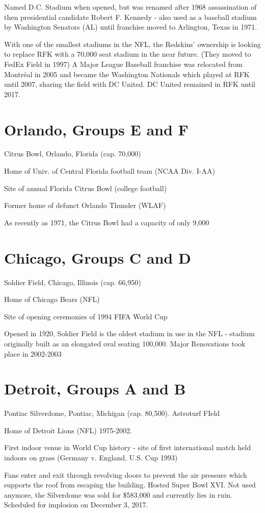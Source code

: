 Named D.C. Stadium when opened, but was renamed after 1968 assassination of 
then presidential candidate Robert F. Kennedy - also used as a baseball stadium
by Washington Senators (AL) until franchise moved to Arlington, Texas in 1971.

With one of the smallest stadiums in the NFL, the Redskins' ownership is 
looking to replace RFK with a 70,000 seat stadium in the near future.  (They moved
to FedEx Field in 1997)  A Major League Baseball franchise was relocated from
Montr{\'e}al in 2005 and became the Washington Nationals which played at RFK until 2007,
sharing the field with DC United.  DC United remained in RFK until 2017.
\section{Orlando, Groups E and F}
Citrus Bowl, Orlando, Florida (cap. 70,000)

Home of Univ. of Central Florida football team (NCAA Div. I-AA)

Site of annual Florida Citrus Bowl (college football)

Former home of defunct Orlando Thunder (WLAF)

As recently as 1971, the Citrus Bowl had a capacity of only 9,000
\section{Chicago, Groups C and D}
Soldier Field, Chicago, Illinois (cap. 66,950)

Home of Chicago Bears (NFL)

Site of opening ceremonies of 1994 FIFA World Cup

Opened in 1920, Soldier Field is the oldest stadium in use in the NFL - stadium
originally built as an elongated oval seating 100,000.  Major Renovations took place 
in 2002-2003
\section{Detroit, Groups A and B}
Pontiac Silverdome, Pontiac, Michigan (cap. 80,500).  Astroturf FIeld

Home of Detroit Lions (NFL) 1975-2002.

First indoor venue in World Cup history - site of first international match 
held indoors on grass (Germany v. England, U.S. Cup 1993)

Fans enter and exit through revolving doors to prevent the air pressure which 
supports the roof from escaping the building.  Hosted Super Bowl XVI. Not used anymore, the Silverdome was sold for \$583,000 and
currently lies in ruin.  Scheduled for implosion on December 3, 2017.
